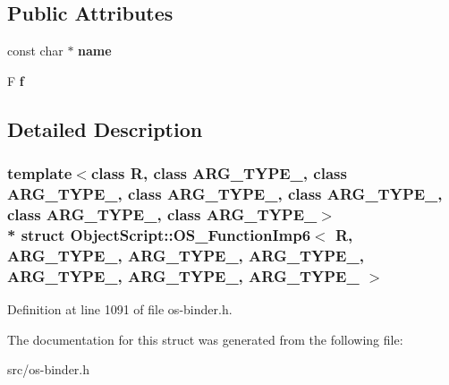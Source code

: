 \subsection*{Public Attributes}
\begin{DoxyCompactItemize}
\item 
const char $\ast$ {\bfseries name}\hypertarget{struct_object_script_1_1_o_s___function_imp6_ab9fa4abfc4c8dd7e5636bbfaecc4ac49}{}\label{struct_object_script_1_1_o_s___function_imp6_ab9fa4abfc4c8dd7e5636bbfaecc4ac49}

\item 
F {\bfseries f}\hypertarget{struct_object_script_1_1_o_s___function_imp6_a93a036cd20e3d347523c6e9c80b1828e}{}\label{struct_object_script_1_1_o_s___function_imp6_a93a036cd20e3d347523c6e9c80b1828e}

\end{DoxyCompactItemize}


\subsection{Detailed Description}
\subsubsection*{template$<$class R, class A\+R\+G\+\_\+\+T\+Y\+P\+E\+\_, class A\+R\+G\+\_\+\+T\+Y\+P\+E\+\_, class A\+R\+G\+\_\+\+T\+Y\+P\+E\+\_, class A\+R\+G\+\_\+\+T\+Y\+P\+E\+\_, class A\+R\+G\+\_\+\+T\+Y\+P\+E\+\_, class A\+R\+G\+\_\+\+T\+Y\+P\+E\+\_$>$\\*
struct Object\+Script\+::\+O\+S\+\_\+\+Function\+Imp6$<$ R, A\+R\+G\+\_\+\+T\+Y\+P\+E\+\_, A\+R\+G\+\_\+\+T\+Y\+P\+E\+\_, A\+R\+G\+\_\+\+T\+Y\+P\+E\+\_, A\+R\+G\+\_\+\+T\+Y\+P\+E\+\_, A\+R\+G\+\_\+\+T\+Y\+P\+E\+\_, A\+R\+G\+\_\+\+T\+Y\+P\+E\+\_ $>$}



Definition at line 1091 of file os-\/binder.\+h.



The documentation for this struct was generated from the following file\+:\begin{DoxyCompactItemize}
\item 
src/os-\/binder.\+h\end{DoxyCompactItemize}
